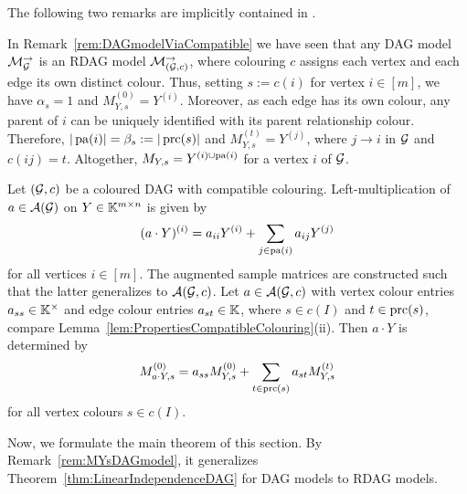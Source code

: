 The following two remarks are implicitly contained in \cite{RDAG}.

\begin{remark} \label{rem:MYsDAGmodel}
	In Remark~\ref{rem:DAGmodelViaCompatible} we have seen that any DAG model $\mathcal{M}_{\mathcal{G}}^{\to}$ is an RDAG model $\mathcal{M}_{(\mathcal{G}, c)}^{\to}$, where colouring $c$ assigns each vertex and each edge its own distinct colour. Thus, setting $s := c(i)$ for vertex $i \in [m]$, we have $\alpha_s = 1$ and $M_{Y,s}^{(0)} = Y^{(i)}$. Moreover, as each edge has its own colour, any parent of $i$ can be uniquely identified with its parent relationship colour. Therefore, $ |\operatorname{pa}(i)| = \beta_s := |\operatorname{prc}(s)|$ and $M_{Y,s}^{(t)} = Y^{(j)}$, where $j \to i$ in $\mathcal{G}$ and $c(ij) = t$.
	Altogether, $M_{Y,s} = Y^{(i) \cup \operatorname{pa}(i)}$ for a vertex $i$ of $\mathcal{G}$.
	\hfill\remSymbol
\end{remark}

\begin{remark}\label{rem:MYsAndActionOfAGc}
	Let $(\mathcal{G}, c)$ be a coloured DAG with compatible colouring. Left-multiplication of $a \in \mathcal{A}(\mathcal{G})$ on $Y \in \mathbb K^{m \times n}$ is given by
		\[ (a \cdot Y)^{(i)} = a_{{ii}} Y^{(i)} + \sum_{j \in \operatorname{pa}(i)} a_{ij} Y^{(j)} \]
	for all vertices $i \in [m]$. The augmented sample matrices are constructed such that the latter generalizes to $\mathcal{A}(\mathcal{G}, c)$. Let $a \in \mathcal{A}(\mathcal{G}, c)$ with vertex colour entries $a_{ss} \in \mathbb K^{\times}$ and edge colour entries $a_{st} \in \mathbb K$, where $s \in c(I)$ and $t \in \operatorname{prc}(s)$, compare Lemma~\ref{lem:PropertiesCompatibleColouring}(ii). Then $a \cdot Y$ is determined by
		\begin{equation}\label{eq:MYsLeftMultiplication}
			M^{(0)}_{a \cdot Y, s} = a_{ss} M^{(0)}_{Y,s} + \sum_{t \in \operatorname{prc}(s)} a_{st} M^{(t)}_{Y,s}
		\end{equation}
	for all vertex colours $s \in c(I)$.
	\hfill\remSymbol
\end{remark}

Now, we formulate the main theorem of this section. By Remark~\ref{rem:MYsDAGmodel}, it generalizes Theorem~\ref{thm:LinearIndependenceDAG} for DAG models to RDAG models.

